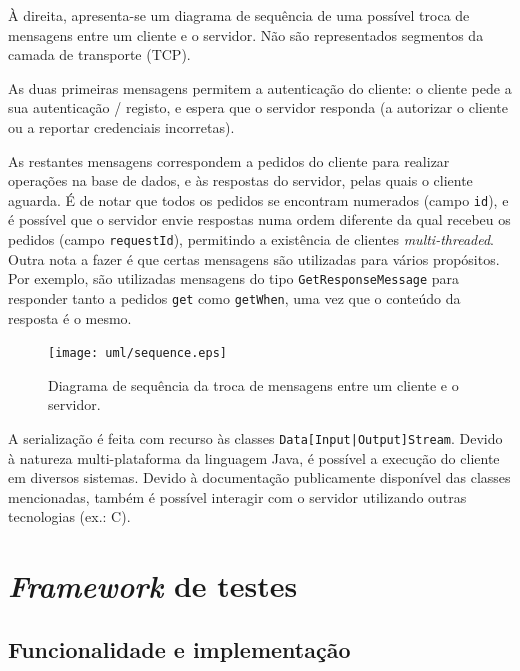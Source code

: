 \documentclass[11pt, a4paper]{article}
\begin{document}
\begin{minipage}{0.5\textwidth}
    \setlength{\parskip}{\baselineskip}
    \setlength{\parindent}{0pt}

    À direita, apresenta-se um diagrama de sequência de uma possível troca de mensagens entre um
    cliente e o servidor. Não são representados segmentos da camada de transporte (TCP).

    As duas primeiras mensagens permitem a autenticação do cliente: o cliente pede a sua
    autenticação / registo, e espera que o servidor responda (a autorizar o cliente ou a reportar
    credenciais incorretas).

    As restantes mensagens correspondem a pedidos do cliente para realizar operações na base de
    dados, e às respostas do servidor, pelas quais o cliente aguarda. É de notar que todos os
    pedidos se encontram numerados (campo \texttt{id}), e é possível que o servidor envie respostas
    numa ordem diferente da qual recebeu os pedidos (campo \texttt{requestId}), permitindo a
    existência de clientes \emph{multi-threaded}. Outra nota a fazer é que certas mensagens são
    utilizadas para vários propósitos. Por exemplo, são utilizadas mensagens do tipo
    \texttt{GetResponseMessage} para responder tanto a pedidos \texttt{get} como \texttt{getWhen},
    uma vez que o conteúdo da resposta é o mesmo.
\end{minipage}
\hspace{0.03\textwidth}
\begin{minipage}{0.47\textwidth}
    \begin{figure}[H]
        \centering
        \texttt{[image: uml/sequence.eps]}
        \caption{Diagrama de sequência da troca de mensagens entre um cliente e o servidor.}
        \label{sequence}
    \end{figure}
\end{minipage}

A serialização é feita com recurso às classes \texttt{Data[Input|Output]Stream}. Devido à natureza
multi-plataforma da linguagem Java, é possível a execução do cliente em diversos sistemas. Devido à
documentação publicamente disponível das classes mencionadas, também é possível interagir com o
servidor utilizando outras tecnologias (ex.: C).

\section{\emph{Framework} de testes}

\subsection{Funcionalidade e implementação}
\end{document}
